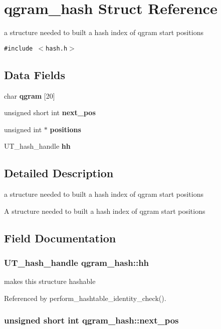 \section{qgram\_\-hash Struct Reference}
\label{structqgram__hash}
a structure needed to built a hash index of qgram start positions  


{\tt \#include $<$hash.h$>$}

\subsection*{Data Fields}
\begin{CompactItemize}
\item 
char {\bf qgram} [20]
\item 
unsigned short int {\bf next\_\-pos}
\item 
unsigned int $\ast$ {\bf positions}
\item 
UT\_\-hash\_\-handle {\bf hh}
\end{CompactItemize}


\subsection{Detailed Description}
a structure needed to built a hash index of qgram start positions 

A structure needed to built a hash index of qgram start positions 

\subsection{Field Documentation}
\subsubsection[{hh}]{\setlength{\rightskip}{0pt plus 5cm}UT\_\-hash\_\-handle {\bf qgram\_\-hash::hh}}\label{structqgram__hash_b956d162358231b4d70cf60e3905c016}


makes this structure hashable 

Referenced by perform\_\-hashtable\_\-identity\_\-check().
\subsubsection[{next\_\-pos}]{\setlength{\rightskip}{0pt plus 5cm}unsigned short int {\bf qgram\_\-hash::next\_\-pos}}\label{structqgram__hash_1b436254bc70221a4fabd1557889e8d0}


